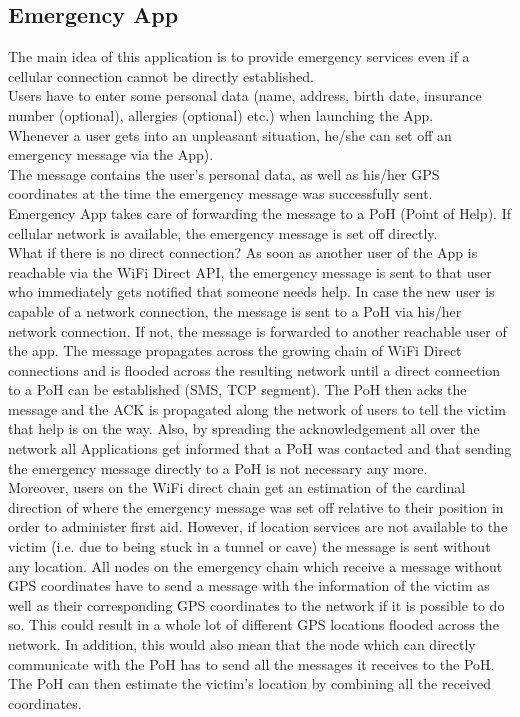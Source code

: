 \subsection{Emergency App}
The main idea of this application is to provide emergency services even if a cellular connection cannot be directly established. \\
Users have to enter some personal data (name, address, birth date, insurance number (optional), allergies (optional) etc.) when launching the App. \\
Whenever a user gets into an unpleasant situation, he/she can set off an emergency message via the App). \\
The message contains the user's personal data, as well as his/her GPS coordinates at the time the emergency message was successfully sent. \\
Emergency App takes care of forwarding the message to a PoH (Point of Help). If cellular network is available, the emergency message is set off directly. \\
What if there is no direct connection? As soon as another user of the App is reachable via the WiFi Direct API, the emergency message is sent to that user who immediately gets notified that someone needs help. In case the new user is capable of a network connection, the message is sent to a PoH via his/her network connection. If not, the message is forwarded to another reachable user of the app. The message propagates across the growing chain of WiFi Direct connections and is flooded across the resulting network until a direct connection to a PoH can be established (SMS, TCP segment).
The PoH then acks the message and the ACK is propagated along the network of users to tell the victim that help is on the way. Also, by spreading the acknowledgement all over the network all Applications get informed that a PoH was contacted and that sending the emergency message directly to a PoH is not necessary any more. \\
Moreover, users on the WiFi direct chain get an estimation of the cardinal direction of where the emergency message was set off relative to their position in order to administer first aid.
However, if location services are not available to the victim (i.e. due to being stuck in a tunnel or cave) the message is sent without any location. All nodes on the emergency chain which receive a message without GPS coordinates have to send a message with the information of the victim as well as their corresponding GPS coordinates to the network if it is possible to do so.
This could result in a whole lot of different GPS locations flooded across the network. In addition, this would also mean that the node which can directly communicate with the PoH has to send all the messages it receives to the PoH. The PoH can then estimate the victim's location by combining all the received coordinates.
		
